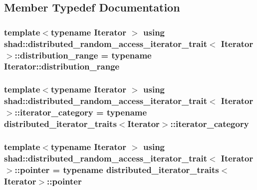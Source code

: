 \subsection{Member Typedef Documentation}
\hypertarget{structshad_1_1distributed__random__access__iterator__trait_a8981d6d76b421929c62efdd94ea806a3}{
\subsubsection[{distribution\-\_\-range}]{\setlength{\rightskip}{0pt plus 5cm}template$<$typename Iterator $>$ using {\bf shad\-::distributed\-\_\-random\-\_\-access\-\_\-iterator\-\_\-trait}$<$ Iterator $>$\-::{\bf distribution\-\_\-range} =  typename Iterator\-::distribution\-\_\-range}}\label{structshad_1_1distributed__random__access__iterator__trait_a8981d6d76b421929c62efdd94ea806a3}
\hypertarget{structshad_1_1distributed__random__access__iterator__trait_a6794da2277108e23065517078bbf8e93}{
\subsubsection[{iterator\-\_\-category}]{\setlength{\rightskip}{0pt plus 5cm}template$<$typename Iterator $>$ using {\bf shad\-::distributed\-\_\-random\-\_\-access\-\_\-iterator\-\_\-trait}$<$ Iterator $>$\-::{\bf iterator\-\_\-category} =  typename {\bf distributed\-\_\-iterator\-\_\-traits}$<$Iterator$>$\-::{\bf iterator\-\_\-category}}}\label{structshad_1_1distributed__random__access__iterator__trait_a6794da2277108e23065517078bbf8e93}
\hypertarget{structshad_1_1distributed__random__access__iterator__trait_aa7a80d89b4f5361c95d2cf7c682dc890}{
\subsubsection[{pointer}]{\setlength{\rightskip}{0pt plus 5cm}template$<$typename Iterator $>$ using {\bf shad\-::distributed\-\_\-random\-\_\-access\-\_\-iterator\-\_\-trait}$<$ Iterator $>$\-::{\bf pointer} =  typename {\bf distributed\-\_\-iterator\-\_\-traits}$<$Iterator$>$\-::{\bf pointer}}}\label{structshad_1_1distributed__random__access__iterator__trait_aa7a80d89b4f5361c95d2cf7c682dc890}
